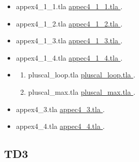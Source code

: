\documentclass[ 12pt]{article}
\begin{document}
 \begin{itemize}
  \item[]   appex4\_1\_1.tla 
    \href{http://mery54.github.io/teaching/mvsi/models/appex4_1_1.tla}{
      appec4\_1\_1.tla }.

      \item[]   appex4\_1\_2.tla 
    \href{http://mery54.github.io/teaching/mvsi/models/appex4_1_2.tla}{
      appec4\_1\_2.tla }.


  \item[]   appex4\_1\_3.tla 
    \href{http://mery54.github.io/teaching/mvsi/models/appex4_1_3.tla}{      appec4\_1\_3.tla }.

    
  \item[]   appex4\_1\_4.tla 
    \href{http://mery54.github.io/teaching/mvsi/models/appex4_1_4.tla}{
      appec4\_1\_4.tla }.
    
  \item[]

    \begin{enumerate}

    \item[]   pluscal\_loop.tla 
    \href{http://mery54.github.io/teaching/mvsi/models/pluscal_loop.tla}{      pluscal\_loop.tla }.

        \item[]   pluscal\_max.tla 
    \href{http://mery54.github.io/teaching/mvsi/models/pluscal_max.tla}{
      pluscal\_max.tla }.
   
    \end{enumerate}

\item[]   appex4\_3.tla 
    \href{http://mery54.github.io/teaching/mvsi/models/appex4_3.tla}{      appec4\_3.tla }.


    \item[]   appex4\_4.tla 
    \href{http://mery54.github.io/teaching/mvsi/models/appex4_4.tla}{      appec4\_4.tla }.


  \end{itemize}

  
\subsection{TD3}
    
\end{document}
